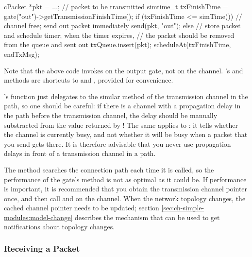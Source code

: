 \begin{cpp}
cPacket *pkt = ...; // packet to be transmitted
simtime_t txFinishTime = gate("out")->getTransmissionFinishTime();
if (txFinishTime <= simTime())
{
    // channel free; send out packet immediately
    send(pkt, "out");
}
else
{
    // store packet and schedule timer; when the timer expires,
    // the packet should be removed from the queue and sent out
    txQueue.insert(pkt);
    scheduleAt(txFinishTime, endTxMsg);
}
\end{cpp}

Note that the above code invokes  on the
output gate, not on the channel. 's
 and  methods are
shortcuts to  and
, provided for
convenience.

\begin{note}
  's  function just
  delegates to the similar method of the transmission channel in the path, so
  one should be careful: if there is a channel with a propagation delay in
  the path before the transmission channel, the delay should be manually
  substracted from the value returned by !
  The same applies to : it tells whether the channel is
  currently busy, and not whether it will be busy when a packet that you send
  gets there. It is therefore advisable that you never use propagation delays
  in front of a transmission channel in a path.
\end{note}

The  method searches the connection path each
time it is called, so the performance of the gate's
 method is not as optimal as it could be.
If performance is important, it is recommended that you obtain the
transmission channel pointer once, and then call  and
 on the channel. When the network topology
changes, the cached channel pointer needs to be updated; section
\ref{sec:ch-simple-modules:model-change} describes the mechanism that can
be used to get notifications about topology changes.

\subsubsection{Receiving a Packet}

